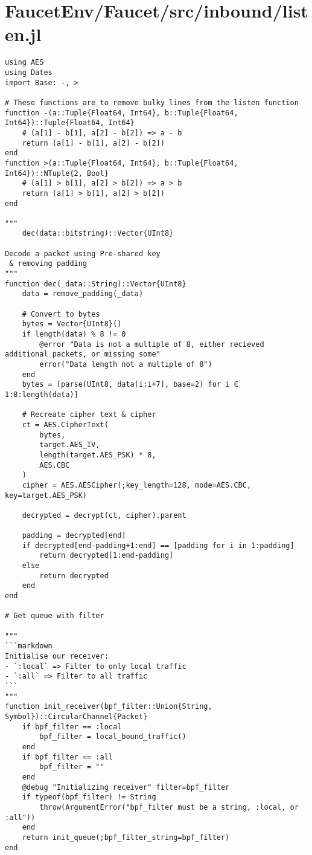 \section{FaucetEnv/Faucet/src/inbound/listen.jl}
\begin{lstlisting}[language=JuliaLocal, style=julia]
using AES
using Dates
import Base: -, >

# These functions are to remove bulky lines from the listen function
function -(a::Tuple{Float64, Int64}, b::Tuple{Float64, Int64})::Tuple{Float64, Int64}
    # (a[1] - b[1], a[2] - b[2]) => a - b
    return (a[1] - b[1], a[2] - b[2])
end
function >(a::Tuple{Float64, Int64}, b::Tuple{Float64, Int64})::NTuple{2, Bool}
    # (a[1] > b[1], a[2] > b[2]) => a > b
    return (a[1] > b[1], a[2] > b[2])
end

"""
    dec(data::bitstring)::Vector{UInt8}

Decode a packet using Pre-shared key
 & removing padding
"""
function dec(_data::String)::Vector{UInt8}
    data = remove_padding(_data)

    # Convert to bytes
    bytes = Vector{UInt8}()
    if length(data) % 8 != 0
        @error "Data is not a multiple of 8, either recieved additional packets, or missing some"
        error("Data length not a multiple of 8")
    end
    bytes = [parse(UInt8, data[i:i+7], base=2) for i ∈ 1:8:length(data)]

    # Recreate cipher text & cipher
    ct = AES.CipherText(
        bytes,
        target.AES_IV,
        length(target.AES_PSK) * 8,
        AES.CBC
    )
    cipher = AES.AESCipher(;key_length=128, mode=AES.CBC, key=target.AES_PSK)
    
    decrypted = decrypt(ct, cipher).parent

    padding = decrypted[end]
    if decrypted[end-padding+1:end] == [padding for i in 1:padding]
        return decrypted[1:end-padding]
    else
        return decrypted
    end
end
    
# Get queue with filter

"""
```markdown
Initialise our receiver:
- `:local` => Filter to only local traffic
- `:all` => Filter to all traffic
```
"""
function init_receiver(bpf_filter::Union{String, Symbol})::CircularChannel{Packet}
    if bpf_filter == :local
        bpf_filter = local_bound_traffic()
    end
    if bpf_filter == :all
        bpf_filter = ""
    end
    @debug "Initializing receiver" filter=bpf_filter
    if typeof(bpf_filter) != String
        throw(ArgumentError("bpf_filter must be a string, :local, or :all"))
    end
    return init_queue(;bpf_filter_string=bpf_filter)
end


\end{lstlisting}
